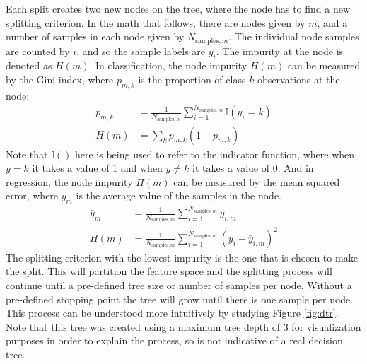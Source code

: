 Each split creates two new nodes on the tree, where the node has to find a new
splitting criterion. In the math that follows, there are nodes given by $m$,
and a number of samples in each node given by $N_{\text{samples}, m}$. The
individual node samples are counted by $i$, and so the sample labels are $y_i$.
The impurity at the node is denoted as $H(m)$.  In classification, the node
impurity $H(m)$ can be measured by the Gini index, where $p_{m, k}$ is the
proportion of class $k$ observations at the node:
\begin{equation}
  \begin{aligned}
    p_{m, k} &= \frac{1}{N_{\text{samples}, m}} \sum_{i=1}^{N_{\text{samples}, m}}
                \mathbb{I}(y_i = k)
    \\
    H(m) &= \sum_k p_{m, k} (1 - p_{m, k})
  \end{aligned}
  \label{eq:gini}
\end{equation}
Note that $\mathbb{I}()$ here is being used to refer to the indicator function,
where when $y=k$ it takes a value of 1 and when $y \neq k$ it takes a value of 0.
And in regression, the node impurity $H(m)$ can be measured by the mean squared
error, where $\bar{y}_m$ is the average value of the samples in the node.
\begin{equation}
  \begin{aligned}
    \bar{y}_m &= \frac{1}{N_{\text{samples}, m}} \sum_{i=1}^{N_{\text{samples}, m}} 
                 y_{i, m}
    \\
    H(m) &= \frac{1}{N_{\text{samples}, m}} \sum_{i=1}^{N_{\text{samples}, m}}
            (y_i - \bar{y}_{i, m})^2
  \end{aligned}
  \label{eq:mse}
\end{equation}
The splitting criterion with the lowest impurity is the one that is chosen to
make the split.  This will partition the feature space and the splitting
process will continue until a pre-defined tree size or number of samples per
node. Without a pre-defined stopping point the tree will grow until there is
one sample per node. This process can be understood more intuitively by
studying Figure \ref{fig:dtr}. Note that this tree was created using a maximum
tree depth of $3$ for visualization purposes in order to explain the process,
so is not indicative of a real decision tree.

